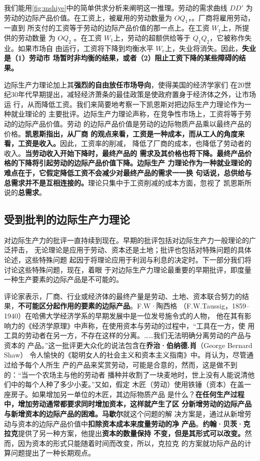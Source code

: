 我们能用\cref{fig:mshiye}中的简单供求分析来阐明这一推理。劳动的需求曲线 $DD'$ 为
劳动的边际产品价值。在工资上，被雇用的劳动数量为 $OQ_1$，。厂商将雇用劳动，一直到
所支付的工资等于劳动的边际产品价值的那一点上。在工资 $W_1$上，所提供的劳动数量
为 $OQ_2$ 。在工资 $W_1$上，劳动的超额供给等于 $Q_1Q_2$，它被称作失业。如果市场自
由运行，工资将下降到均衡水平 $W_e$上，失业将消失。因此，\textbf{失业是（1）劳动市
  场暂时非均衡的结果，或者（2）阻止工资下降的某些障碍的结果。}

边际生产力理论加上其\textbf{强烈的自由放任市场导向}，使得美国的经济学家们
在20世纪30年代早期提出，减轻经济萧条的最佳政策是使政府置身于经济体之外，让市场运
行，从而降低工资。我们来简要地考察一下凯恩斯对把边际生产力理论作为一种就业理论的
主要批评。边际生产力理论声称，在竞争性市场上，工资将等于劳动的边际产品价值。劳动
的边际产品价值是劳动的边际物质产品乘以最终产品的价格。\textbf{凯恩斯指出，从厂商
  的观点来看，工资是一种成本，而从工人的角度来看，工资是收入。}因此，工资率的削减，
降低了厂商的成本，也降低了劳动者的收入。\textbf{当劳动收入开始下降时，最终产品的
  需求及其价格也将下降。最终产品价格的下降将引起劳动的边际产品价值下降。边际生产
  力理论作为一种就业理论的难点在于，它假定降低工资不会减少对最终产品的需求一一换
  句话说，总供给与总需求并不是互相连接的。}理论只集中于工资削减的成本方面，忽视了
凯恩斯所说的\textbf{总需求}。

\subsection{受到批判的边际生产力理论}

对边际生产力的批评一直持续到现在。早期的批评包括对边际生产力一般理论的广泛抨击，
无论理论是应用于劳动、资本还是土地；批评也包括对特殊问题的具体论述，这些特殊问题
起因于将理论应用于利润与利息的决定时。下一部分我们将讨论这些特殊问题，现在，着眼
于对边际生产力理论最重要的早期批评，即度量一种生产要素的边际产品是不可能的。

评论家表示，厂商、行业或经济体的最终产量是劳动、土地、资本联合努力的结
果，\textbf{不可能区分起作用的要素的边际产品}。F.W·陶西格
（F.W.Taussig，1859--1940）在哈佛大学经济学系的早期发展中是一位发号施令式的人物，
他在其有影响力的《经济学原理》中声称，在使用资本与劳动的过程中，“工具在一方，使
用工具的劳动者在另一方，不存在这样的分离。……我们无法明确分离劳动的产品与资本的
产品。”这一批评更大众化的说法包含在\textbf{乔治·伯纳德.肖}（George Bernard Shaw）
令人愉快的《聪明女人的社会主义和资本主义指南》中。肖认为，尽管通过给予每个人所生
产的产品来奖赏劳动，可能是合意的，然而，这是做不到的：“当一个农场主与他的劳动者
播种并收割了一块麦地时，世上没有人能说清他们中的每个人种了多少小麦。”又如，假定
木匠（劳动）使用铁锤（资本）在盖一座房子。如果增加另一单位的木匠，其边际物质产品
是什么？\textbf{在任何生产过程中，增加劳动通常都要求同时增加资本，这样就产生了区
  分新增劳动的边际产品与新增资本的边际产品的困难。}\textbf{马歇尔}就这个问题的解
决方案是，通过从新增劳动与资本的边际产品价值中\textbf{扣除资本成本来度量劳动的净
  产品}。\textbf{约翰·贝茨·克拉克}提供了另一种方案，他提出\textbf{资本的数量保持
  不变，但是其形式可以改变。}然而，因为资本的形式只能随着时间而改变，所以，克拉克
的方案就功际产品的计算问题提出了一种长期观点。

